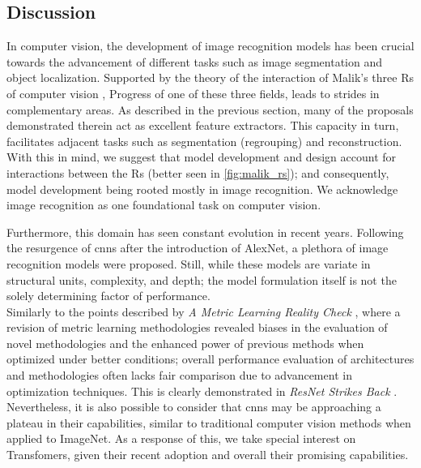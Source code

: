 \subsection{Discussion}
\label{subsec:rel_recon_discussion}
In computer vision, the development of image recognition models has been crucial 
towards the advancement of different tasks such as image segmentation and object localization. 
Supported by the theory of the interaction of Malik's three Rs of computer vision 
\autocite{malik2016three}, Progress of one of these three fields, leads to strides 
in complementary areas. As described in the previous section, many of the proposals demonstrated 
therein act as excellent feature extractors. This capacity in turn, facilitates adjacent tasks 
such as segmentation (regrouping) and reconstruction. With this in mind, we suggest that model 
development and design account for interactions between the Rs (better seen in  
\autoref{fig:malik_rs}); and consequently, model development being rooted mostly in image 
recognition. We acknowledge image recognition as one foundational task on computer vision.



\noindent Furthermore, this domain has seen constant evolution in recent years. Following the 
resurgence of \glspl{cnn} after the introduction of AlexNet, a plethora of image recognition models 
were proposed. Still, while these models are variate in structural units, complexity, 
and depth; the model formulation  itself is not the solely determining factor of performance.\\

\noindent Similarly to the points described by \emph{A Metric Learning Reality 
Check} \autocite{musgrave2020metric}, where a revision of metric learning methodologies revealed 
biases in the evaluation of novel methodologies and the enhanced power of 
previous methods when optimized under better conditions; overall performance evaluation of 
architectures and methodologies often lacks fair comparison due to advancement in optimization 
techniques. This is clearly demonstrated in \emph{ResNet Strikes Back} \autocite{wightman2021resnet}. 
Nevertheless, it is also possible to consider that \glspl{cnn} may be approaching a plateau in 
their capabilities, similar to traditional computer vision methods  when applied to ImageNet. As 
a response of this, we take special interest on Transfomers, given their recent adoption and 
overall their promising capabilities. \\

